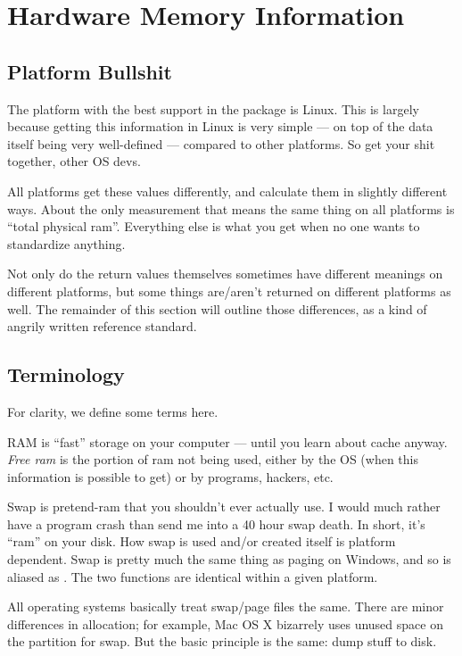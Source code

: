 \section{Hardware Memory Information}

\subsection{Platform Bullshit}

The platform with the best support in the  package is Linux.  This 
is largely because getting this information in Linux is very simple --- on top 
of the data itself being very well-defined --- compared to other platforms.  So 
get your shit together, other OS devs.

All platforms get these values differently, and calculate them in slightly 
different ways.  About the only measurement that means the same thing on all 
platforms is ``total physical ram''.  Everything else is what you get when no 
one wants to standardize anything.

Not only do the return values themselves sometimes have different meanings on 
different platforms, but some things are/aren't returned on different platforms 
as well.  The remainder of this section will outline those differences, as a 
kind of angrily written reference standard.



\subsection{Terminology}

For clarity, we define some terms here.

RAM is ``fast'' storage on your computer --- until you learn about cache 
anyway.  \emph{Free ram} is the portion of ram not being used, either by the OS 
(when this information is possible to get) or by programs, hackers, etc.

Swap is pretend-ram that you shouldn't ever actually use.  I would much
rather have a program crash than send me into a 40 hour swap death.  In 
short, it's ``ram'' on your disk.  How swap is used and/or created itself is 
platform dependent.  Swap is pretty much the same thing as paging on 
Windows, and so  is aliased as .  The 
two functions are identical within a given platform.

All operating systems basically treat swap/page files the same.  There are minor 
differences in allocation; for example, Mac OS X bizarrely uses unused space on 
the  partition for swap.  But the basic principle is the same: dump 
stuff to disk.



